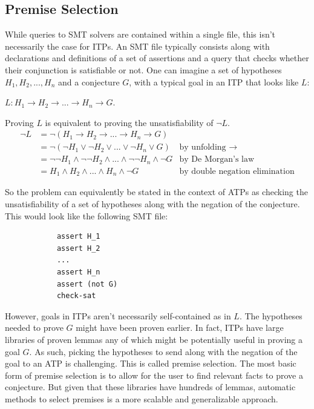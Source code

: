 \documentclass{article}
\begin{document}
	\subsection{Premise Selection}
		While queries to SMT solvers are contained within a single 
		file, this isn't necessarily the case for ITPs. An SMT file
		typically consists along with declarations and definitions 
		of a set of assertions and a query that checks whether 
		their conjunction is satisfiable or not. 
		One can imagine a set of hypotheses 
		$H_1, H_2, ..., H_n$ and a conjecture $G$, with a 
		typical goal in an ITP that looks like $L$:
		\begin{center}
			$L : H_1 \to H_2 \to ... \to H_n \to G$.
		\end{center}
		Proving $L$ is equivalent to proving the unsatisfiability 
		of $\neg L$.
		\begin{align*}
			\neg L &= \neg (H_1 \to H_2 \to ... \to H_n \to G)\\
			&= \neg (\neg H_1 \lor \neg H_2 \lor ... \lor \neg H_n \lor G)
			& \text{by unfolding }\to \\
			&= \neg \neg H_1 \land \neg \neg H_2 \land ... \land \neg \neg H_n 
			\land \neg G
			& \text{by De Morgan's law}\\
			&= H_1 \land H_2 \land ... \land H_n \land \neg G
			& \text{by double negation elimination}
		\end{align*}
	
		So the problem can equivalently be stated in the context of ATPs
		as checking the unsatisfiability of a set of hypotheses 
		along with the negation of the conjecture. This would look 
		like the following SMT file:
		\begin{verbatim}
			assert H_1
			assert H_2
			...
			assert H_n
			assert (not G)
			check-sat
		\end{verbatim}
		However, goals in ITPs aren't necessarily self-contained 
		as in $L$. The hypotheses needed to prove $G$ 
		might have been proven earlier. In fact, ITPs have large
		libraries of proven lemmas any of which might be potentially 
		useful in proving a goal $G$. As such, picking
		the hypotheses to send along with the negation of the 
		goal to an ATP is challenging. This is called premise 
		selection. The most basic form of premise selection 
		is to allow for the user to find relevant facts 
		to prove a conjecture. But given that these libraries 
		have hundreds of lemmas, automatic methods to select 
		premises is a more scalable and generalizable approach.
	
\end{document}
